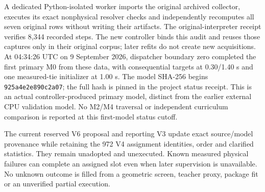 A dedicated Python-isolated worker imports the original archived collector,
executes its exact nonphysical resolver checks and independently recomputes all
seven original rows without writing their artifacts. The original-interpreter
receipt verifies 8,344 recorded steps. The new controller binds this audit and
reuses those captures only in their original corpus; later refits do not create
new acquisitions. At 04:34:26 UTC on 9 September 2026, dispatcher boundary zero
completed the first primary M0 from these data, with consequential targets at
0.30/1.40 s and one measured-tie initializer at 1.00 s. The model SHA-256 begins
\texttt{925a4e2e890c2a07}; the full hash is pinned in the project status receipt.
This is an actual controller-produced primary model, distinct from the earlier
external CPU validation model. No M2/M4 traversal or independent curriculum
comparison is reported at this first-model status cutoff.

The current reserved V6 proposal and reporting V3 update exact source/model
provenance while retaining the 972 V4 assignment identities, order and clarified
statistics. They remain unadopted and unexecuted. Known measured physical failures
can complete an assigned slot even when later supervision is unavailable. No
unknown outcome is filled from a geometric screen, teacher proxy, package fit or
an unverified partial execution.

